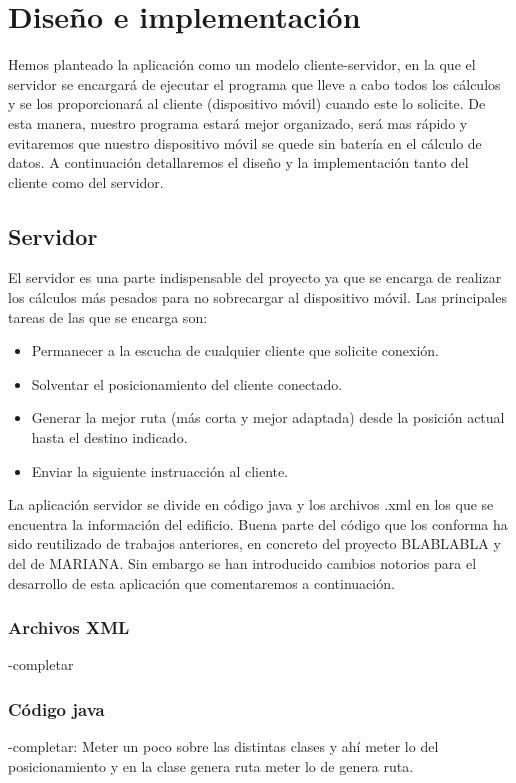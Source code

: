 \chapter{Diseño e implementación}
\label{cap:diseñoeimplementación}


Hemos planteado la aplicación como un modelo cliente-servidor, en la que el servidor se encargará de ejecutar el programa que lleve a cabo todos los cálculos y se los proporcionará al cliente (dispositivo móvil) cuando este lo solicite. De esta manera, nuestro programa estará mejor organizado, será mas rápido y evitaremos que nuestro dispositivo móvil se quede sin batería en el cálculo de datos. A continuación detallaremos el diseño y la implementación tanto del cliente como del servidor.


\section{Servidor}
El servidor es una parte indispensable del proyecto ya que se encarga de realizar los cálculos más pesados para no sobrecargar al dispositivo móvil. Las principales tareas de las que se encarga son:
\begin{itemize}
	\item Permanecer a la escucha de cualquier cliente que solicite conexión.
	\item Solventar el posicionamiento del cliente conectado.
	\item Generar la mejor ruta (más corta y mejor adaptada) desde la posición actual hasta el destino indicado.
	\item Enviar la siguiente instruacción al cliente.	
\end{itemize} 

La aplicación servidor se divide en código java y los archivos .xml en los que se encuentra la información del edificio. Buena parte del código que los conforma ha sido reutilizado de trabajos anteriores, en concreto del proyecto BLABLABLA \cite{TFGguia} y del de MARIANA. Sin embargo se han introducido cambios notorios para el desarrollo de esta aplicación que comentaremos a continuación.
\subsection{Archivos XML}
-completar
\subsection{Código java}
-completar: Meter un poco sobre las distintas clases y ahí meter lo del posicionamiento y en la clase genera ruta meter lo de genera ruta.




